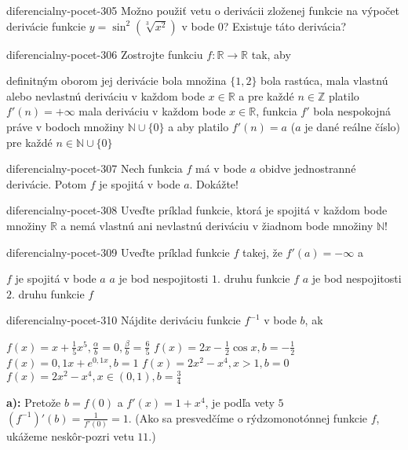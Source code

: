 \begin{defproblem}{diferencialny-pocet-305}
Možno použiť vetu o derivácii zloženej funkcie na výpočet derivácie funkcie
$y=\sin^2(\sqrt[3]{x^2})$ v bode $0$? Existuje táto derivácia?
\end{defproblem}

\begin{defproblem}{diferencialny-pocet-306}
Zostrojte funkciu $f:\mathbb{R}\rightarrow \mathbb{R}$ tak, aby
\begin{tasks}
\task
  definitným oborom jej derivácie bola množina $\{1,2\}$
\task
  bola rastúca, mala vlastnú alebo nevlastnú deriváciu v každom bode
  $x\in\mathbb{R}$ a pre každé $n\in\mathbb{Z}$ platilo $f'(n)=+\infty$
\task
  mala deriváciu v každom bode $x\in\mathbb{R}$, funkcia $f'$ bola nespokojná
  práve v bodoch množiny $\mathbb{N}\cup \{0\}$ a aby platilo $f'(n)=a$ ($a$ je
  dané reálne číslo) pre každé $n\in\mathbb{N}\cup \{0\}$
\end{tasks}
\end{defproblem}

\begin{defproblem}{diferencialny-pocet-307}
Nech funkcia $f$ má v bode $a$ obidve jednostranné derivácie. Potom $f$ je
spojitá v bode $a$. Dokážte!
\end{defproblem}

\begin{defproblem}{diferencialny-pocet-308}
Uveďte príklad funkcie, ktorá je spojitá v každom bode množiny $\mathbb{R}$ a
nemá vlastnú ani nevlastnú deriváciu v žiadnom bode množiny $\mathbb{N}$!
\end{defproblem}

\begin{defproblem}{diferencialny-pocet-309}
Uveďte príklad funkcie $f$ takej, že $f'(a)=-\infty$ a
\begin{tasks}
\task $f$ je spojitá v bode $a$
\task $a$ je bod nespojitosti $1.$ druhu funkcie $f$
\task $a$ je bod nespojitosti $2.$ druhu funkcie $f$
\end{tasks}
\end{defproblem}

\begin{defproblem}{diferencialny-pocet-310}
Nájdite deriváciu funkcie $f^{-1}$ v bode $b$, ak
\begin{tasks}
\task $f(x)=x+\frac{1}{5}x^5,\frac{\alpha}{b}=0,\frac{\beta}{b}=\frac{6}{5}$
\task $f(x)=2x-\frac{1}{2}\cos x,b=-\frac{1}{2}$
\task $f(x)=0,1x+e^{0,1x},b=1$
\task $f(x)=2x^2-x^4,x>1,b=0$
\task $f(x)=2x^2-x^4,x\in (0,1),b=\frac{3}{4}$
\end{tasks}

\begin{solution}
  \textbf{a):}
  Pretože $b=f(0)$ a $f'(x)=1+x^4$, je podľa vety $5$
  $(f^{-1})'(b)=\frac{1}{f'(0)}=1$. (Ako sa presvedčíme o rýdzomonotónnej
  funkcie $f$, ukážeme neskôr-pozri vetu $11.$)
\end{solution}
\end{defproblem}

